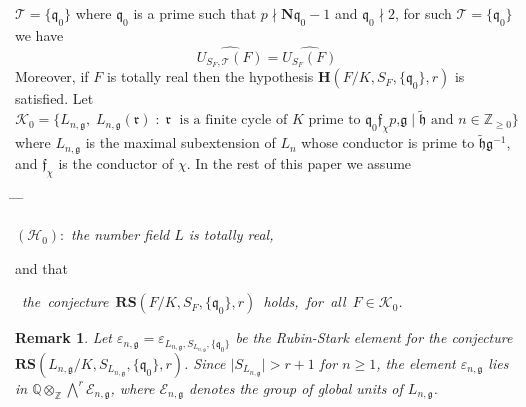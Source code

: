 \documentclass[reqno]{amsart}
\newcounter{dummy} \numberwithin{dummy}{section}
\newtheorem{rem}[dummy]{Remark}
\begin{document}
$\mathcal{T}=\{\mathfrak{q}_{0}\}$ where $\mathfrak{q}_{0}$ is a
prime such that $p\nmid \mathbf{N}\mathfrak{q}_{0}-1$ and
$\mathfrak{q}_{0}\nmid 2$, for such
$\mathcal{T}=\{\mathfrak{q}_{0}\}$ we have
$$\widehat{U_{S_{F},\mathcal{T}}(F)}=\widehat{U_{S_{F}}(F)}$$
Moreover, if $F$ is  totally real then the hypothesis
$\mathbf{H}(F/K,S_{F}, \{\mathfrak{q}_{0}\},r)$ is  satisfied. Let
$$
\mathcal{K}_{0}=\{L_{n,\mathfrak{g}},\;
L_{n,\mathfrak{g}}(\mathfrak{r})\;:\; \mathfrak{r} \;\mbox{ is a
finite cycle of $K$ prime to $\mathfrak{q}_{0}\mathfrak{f}_{\chi}p$,
$\mathfrak{g}\mid \widetilde{\mathfrak{h}}$ and $n\in
\mathbb{Z}_{\geq 0}$}\}
$$
where $L_{n,\mathfrak{g}}$ is the maximal subextension of $L_{n}$
whose conductor is prime to
$\widetilde{\mathfrak{h}}\mathfrak{g}^{-1}$, and
$\mathfrak{f}_{\chi}$ is the conductor of $\chi$. In the rest of
this paper we assume \vskip 7pt
 \begin{center}
  \begin{tabbing}
  \hspace{4.5cm}\=\hspace{0.5cm} \= \hspace{0.4cm} \= \kill
  
  \>$(\mathcal{H}_{0}):$ \> \> \textit{the number field $L$ is totally real,}
\end{tabbing}
\end{center}
and that
\begin{center}
\mbox{\textit{ the conjecture
$\mathbf{RS}(F/K,S_{F},\{\mathfrak{q}_{0}\},r)$ holds, for all $F\in
\mathcal{K}_{0}$.}}
\end{center}
 \begin{rem}
 Let $\varepsilon_{n,\mathfrak{g}}=\varepsilon_{L_{n,\mathfrak{g}},S_{L_{n,\mathfrak{g}}},\{\mathfrak{q}_{0}\}}$
be the Rubin-Stark element for the conjecture\\
$\mathbf{RS}(L_{n,\mathfrak{g}}/K,S_{L_{n,\mathfrak{g}}},\{\mathfrak{q}_{0}\},r)$.
 Since $\mid S_{L_{n,\mathfrak{g}}}\mid> r+1$ for $n\geq 1$, the
element $\varepsilon_{n,\mathfrak{g}}$ lies in
$\mathbb{Q}\otimes_{\mathbb{Z}}\bigwedge^{r}\mathcal{E}_{n,\mathfrak{g}}$,
where $\mathcal{E}_{n,\mathfrak{g}}$ denotes the group of global
units of $L_{n,\mathfrak{g}}$.
 \end{rem}
\end{document}

